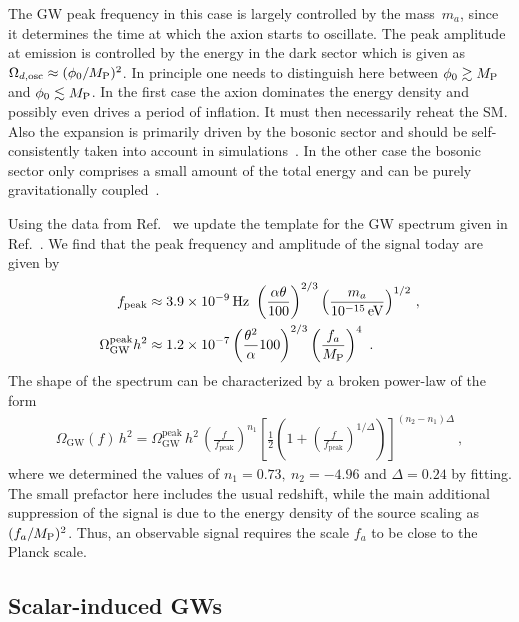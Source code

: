 \documentclass{article}
\begin{document}
The GW peak frequency in this case is largely controlled by the mass~$m_a$, since it determines the time at which the axion starts to oscillate. The peak amplitude at emission is controlled by the energy in the dark sector which is given as $\Omega_{d,\mathrm{osc}}\approx(\phi_0/M_{\rm P})^2$. In principle one needs to distinguish here between $\phi_0\gtrsim M_{\rm P}$ and $\phi_0\lesssim M_{\rm P}$. In the first case the axion dominates the energy density and possibly even drives a period of inflation. It must then necessarily reheat the SM. Also the expansion is primarily driven by the bosonic sector and should be self-consistently taken into account in simulations~\cite{Cuissa:2018oiw,Adshead:2018doq}. In the other case the bosonic sector only comprises a small amount of the total energy and can be purely gravitationally coupled~\cite{Machado:2018nqk,Kitajima:2017peg}. 

Using the data from Ref.~\cite{Ratzinger:2020oct} we update the template for the GW spectrum given in Ref.~\cite{Machado:2019xuc}. We find that the peak frequency and amplitude of the signal today are given by
\begin{align}
    f_\mathrm{peak}&\approx \SI{3.9e-9}{\Hz}\ \left(\frac{\alpha \theta}{100}\right)^{2/3} \left(\frac{m_a}{\SI{e-15}{\eV}}\right)^{1/2}\,,\\
    \Omega_\mathrm{GW}^\mathrm{peak}h^2&\approx \num{1.2e-7} \left(\frac{ \theta^2}{\alpha}100\right)^{2/3}\left(\frac{ f_a}{M_{\rm P}}\right)^{4}~.
\end{align}
The shape of the spectrum can be characterized by a broken power-law of the form
\begin{align}
    \Omega_\mathrm{GW}(f) \,h^2 =\Omega_\mathrm{GW}^\mathrm{peak} \,h^2 \, \left(\frac{f}{f_\mathrm{peak}}\right)^{n_1}\left[\frac{1}{2}\left(1+\left(\frac{f}{f_\mathrm{peak}}\right)^{1/\Delta}\right)\right]^{(n_2-n_1)\Delta}~,
    \label{eqn:AAfit}
\end{align}
where we determined the values of $n_1=0.73,\ n_2=-4.96$ and $\Delta=0.24$ by fitting. The small prefactor here includes the usual redshift, while the main additional suppression of the signal is due to the energy density of the source scaling as $(f_a/M_{\rm P})^2$. Thus, an observable signal requires the scale $f_a$ to be close to the Planck scale. 

\subsection{Scalar-induced GWs}
\label{sec:scalar_induced}
\end{document}
